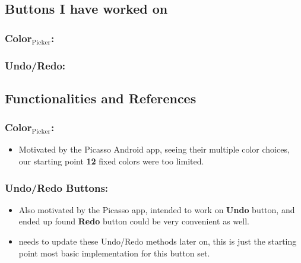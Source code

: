 \documentclass[9pt,b5paper]{article}
\begin{document}
\subsection{Buttons I have worked on}
\label{sec-2-1}
\subsubsection{Color$_{\text{Picker}}$:}
\label{sec-2-1-1}
\subsubsection{Undo/Redo:}
\label{sec-2-1-2}

\subsection{Functionalities and References}
\label{sec-2-2}
\subsubsection{Color$_{\text{Picker}}$:}
\label{sec-2-2-1}
\begin{itemize}
\item Motivated by the Picasso Android app, seeing their multiple color choices, our starting point \textbf{12} fixed colors were too limited.
\end{itemize}
\subsubsection{Undo/Redo Buttons:}
\label{sec-2-2-2}
\begin{itemize}
\item Also motivated by the Picasso app, intended to work on \textbf{Undo} button, and ended up found \textbf{Redo} button could be very convenient as well.
\item needs to update these Undo/Redo methods later on, this is just the starting point most basic implementation for this button set.
\end{itemize}
\end{document}

